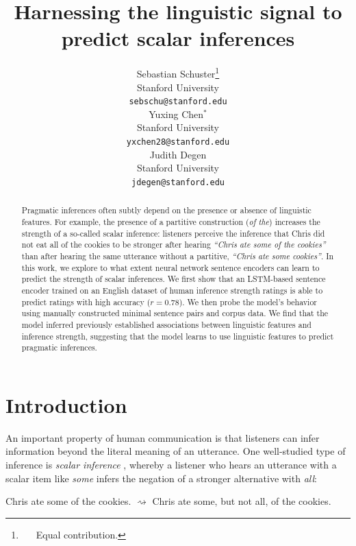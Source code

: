 \documentclass[11pt,a4paper]{article}
\title{Harnessing the linguistic signal to predict scalar inferences}
\author{
  Sebastian Schuster\thanks{\ \ \ Equal contribution.} \\
  Stanford University \\
   {\small \texttt{sebschu@stanford.edu}}   \\\And
  Yuxing Chen${}^*$ \\
  Stanford University \\ 
  {\small \texttt{yxchen28@stanford.edu}} \\\And
  Judith Degen \\
  Stanford University \\
  {\small \texttt{jdegen@stanford.edu}}}
\begin{document}
\maketitle


\begin{abstract}

Pragmatic inferences often subtly depend on the presence or absence of linguistic features. For example, the presence of a partitive construction  (\emph{of the}) increases the strength of a so-called scalar inference: listeners perceive the inference that Chris did not eat all of the cookies to be stronger after hearing \emph{``Chris ate some of the cookies''} than after hearing the same utterance without a partitive, \emph{``Chris ate some cookies''}. In this work, we explore to what extent neural network sentence encoders can learn to predict the strength of scalar inferences. We first show that an LSTM-based sentence encoder trained on an English dataset of human inference strength ratings is able to predict ratings with high accuracy ($r=0.78$). We then probe the model's behavior using manually constructed minimal sentence pairs and corpus data. We find that the model inferred previously established associations between linguistic features and inference strength, suggesting that the model learns to use linguistic features to predict pragmatic inferences. 


\end{abstract}

\section{Introduction}

An important property of human communication is that listeners can {infer} information beyond the literal meaning of an utterance. One well-studied type of inference is \textit{scalar inference} \citep{Grice1975,Horn1984}, whereby a listener who hears an utterance with a scalar item like \textit{some} infers the negation of a stronger alternative with \textit{all}:

\begin{exe}
\small
\ex
\begin{xlist}
\ex \label{ex:cookie} Chris ate some of the cookies.
\ex \label{ex:cookie-inf} $\rightsquigarrow$ Chris ate some, but not all, of the cookies. 
\end{xlist}
\end{exe}

\end{document}

